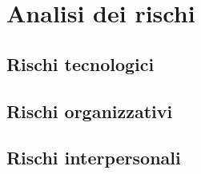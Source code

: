 \section{Analisi dei rischi}



\subsection{Rischi tecnologici}



\subsection{Rischi organizzativi}



\subsection{Rischi interpersonali}

